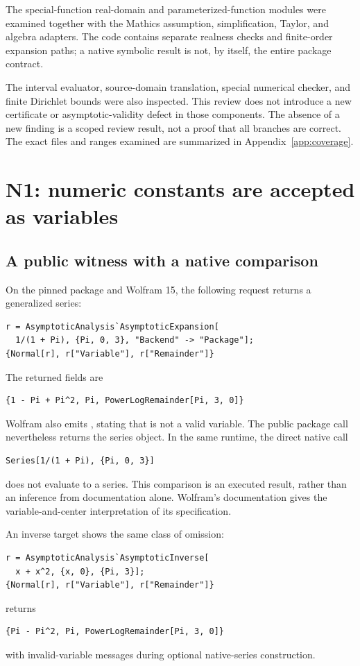 \documentclass[11pt,letterpaper]{article}
\newcommand{\code}[1]{\texttt{\detokenize{#1}}}
\begin{document}
The special-function real-domain and parameterized-function modules were examined together with the Mathics assumption, simplification, Taylor, and algebra adapters. The code contains separate realness checks and finite-order expansion paths; a native symbolic result is not, by itself, the entire package contract.\cite{realdomain,parameterized,mathicscompat,mathicssimplification,mathicstaylor}

The interval evaluator, source-domain translation, special numerical checker, and finite Dirichlet bounds were also inspected. This review does not introduce a new certificate or asymptotic-validity defect in those components. The absence of a new finding is a scoped review result, not a proof that all branches are correct. The exact files and ranges examined are summarized in Appendix~\ref{app:coverage}.

\section{N1: numeric constants are accepted as variables}
\label{sec:n1}

\subsection{A public witness with a native comparison}

On the pinned package and Wolfram 15, the following request returns a generalized series:
\begin{lstlisting}
r = AsymptoticAnalysis`AsymptoticExpansion[
  1/(1 + Pi), {Pi, 0, 3}, "Backend" -> "Package"];
{Normal[r], r["Variable"], r["Remainder"]}
\end{lstlisting}
The returned fields are
\begin{lstlisting}
{1 - Pi + Pi^2, Pi, PowerLogRemainder[Pi, 3, 0]}
\end{lstlisting}
Wolfram also emits \code{SeriesData::sdatv}, stating that \code{Pi} is not a valid variable. The public package call nevertheless returns the series object. In the same runtime, the direct native call
\begin{lstlisting}
Series[1/(1 + Pi), {Pi, 0, 3}]
\end{lstlisting}
does not evaluate to a series. This comparison is an executed result, rather than an inference from documentation alone. Wolfram's \code{Series} documentation gives the variable-and-center interpretation of its specification.\cite{wlseries}

An inverse target shows the same class of omission:
\begin{lstlisting}
r = AsymptoticAnalysis`AsymptoticInverse[
  x + x^2, {x, 0}, {Pi, 3}];
{Normal[r], r["Variable"], r["Remainder"]}
\end{lstlisting}
returns
\begin{lstlisting}
{Pi - Pi^2, Pi, PowerLogRemainder[Pi, 3, 0]}
\end{lstlisting}
with invalid-variable messages during optional native-series construction.
\end{document}

